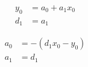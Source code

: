 \begin{align}
  y_0 & = a_0+a_1 x_0  \\
   d_1 & = a_1  
\end{align}

 
\begin{align}
   a_0 & =  - \left(d_1 x_0 - y_0\right)  \\
   a_1 & = d_1   
\end{align}
